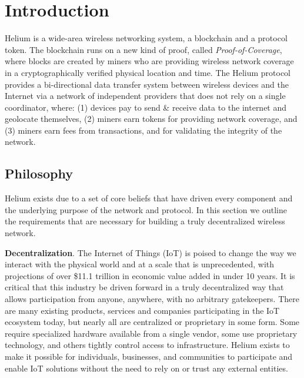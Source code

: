 \documentclass[letterpaper,11pt]{article}
\def\proofofcoverage/{\emph{Proof-of-Coverage}}
\begin{document}
\newpage

\tableofcontents
\newpage

\section{Introduction}

Helium is a wide-area wireless networking system, a blockchain and a protocol token. The blockchain runs on a new kind of proof, called \proofofcoverage/, where blocks are created by miners who are providing wireless network coverage in a cryptographically verified physical location and time. The Helium protocol provides a bi-directional data transfer system between wireless devices and the Internet via a network of independent providers that does not rely on a single coordinator, where: (1) devices pay to send \& receive data to the internet and geolocate themselves, (2) miners earn tokens for providing network coverage, and (3) miners earn fees from transactions, and for validating the integrity of the network.

\subsection{Philosophy}

Helium exists due to a set of core beliefs that have driven every component and the underlying purpose of the network and protocol. In this section we outline the requirements that are necessary for building a truly decentralized wireless network.\newline

\textbf{Decentralization}. The Internet of Things (IoT) is poised to change the way we interact with the physical world and at a scale that is unprecedented, with projections of over \$11.1 trillion in economic value added in under 10 years\cite{mckinsey}. It is critical that this industry be driven forward in a truly decentralized way that allows participation from anyone, anywhere, with no arbitrary gatekeepers. There are many existing products, services and companies participating in the IoT ecosystem today, but nearly all are centralized or proprietary in some form. Some require specialized hardware available from a single vendor, some use proprietary technology, and others tightly control access to infrastructure. Helium exists to make it possible for individuals, businesses, and communities to participate and enable IoT solutions without the need to rely on or trust any external entities.\newline
\end{document}
